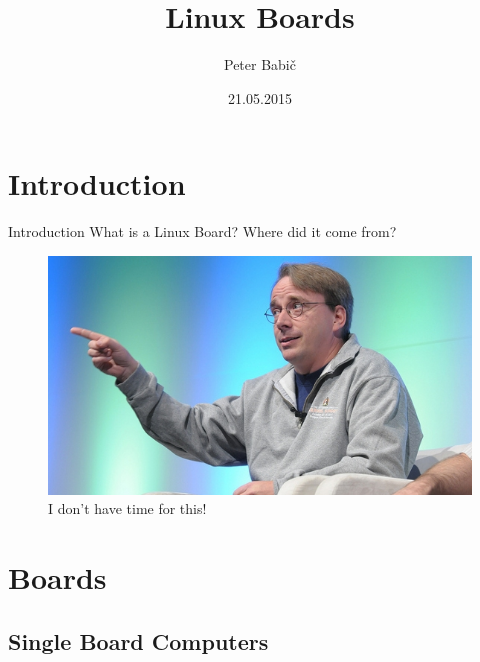 \documentclass[hyperref={unicode}]{beamer}
\title[Linux Boards]{Linux Boards}
\author{Peter Babič}
\institute{Technical University of Košice, Slovakia}
\date{21.05.2015}
\begin{document}
\begin{frame}
  \titlepage
\end{frame}




\section{Introduction}

\begin{frame}{Introduction}
	What is a Linux Board? Where did it come from?
	\begin{figure}
	\includegraphics[width=.7\textwidth]{linus-torvalds-linuxcon.jpg}
	\caption{I don't have time for this!}
	\end{figure}
\end{frame}


\section{Boards}




\subsection{Single Board Computers}
\end{document}

